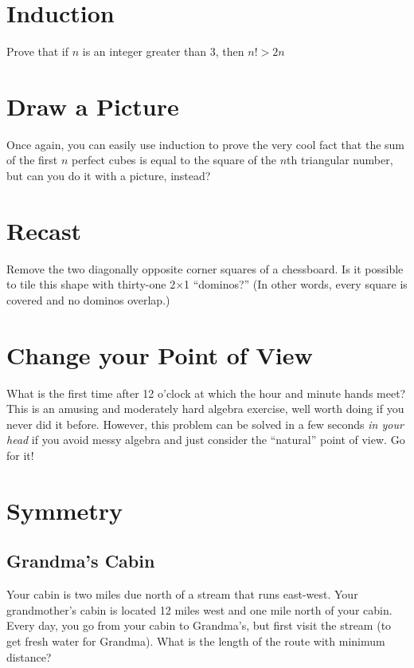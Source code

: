 \documentclass[12pt]{article}
\begin{document}
\section{Induction}

Prove that if $n$ is an integer greater than 3, then $n! > 2n$

\section{Draw a Picture}

Once again, you can easily use induction to prove the very cool fact that the sum of the first $n$ perfect cubes is equal to the square of the $n$th triangular number, but can you do it with a picture, instead?

\section{Recast}

Remove the two diagonally opposite corner squares of a chessboard. Is it possible to tile this shape with thirty-one 2×1 “dominos?” (In other words, every square is covered and no dominos overlap.)

\section{Change your Point of View}

What is the first time after 12 o'clock at which the hour and minute hands meet? This is an amusing and moderately hard algebra exercise, well worth doing if you never did it before. However, this problem can be solved in a few seconds \textit{in your head} if you avoid messy algebra and just consider the ``natural'' point of view. Go for it!

\section{Symmetry}

\subsection{Grandma's Cabin}

Your cabin is two miles due north of a stream that runs east-west. Your grandmother’s cabin is located 12 miles west and one mile north of your cabin. Every day, you go from your cabin to Grandma’s, but first visit the stream (to get fresh water for Grandma). What is the length of the route with minimum distance?
\end{document}

